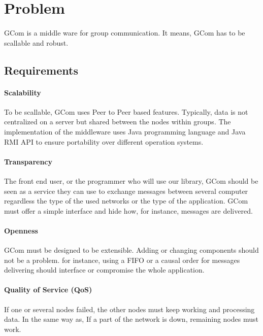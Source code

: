 \section{Problem}

\paragraph{}{
	GCom is a middle ware for group communication. It means,
 GCom has to be scallable and robust.
}

\subsection{Requirements}

\paragraph{Scalability}{
	To be scallable, GCom uses Peer to Peer based features.
 Typically, data is not centralized on a server but shared 
 between the nodes within groups. The implementation of the
 middleware uses Java programming language and Java RMI API to
 ensure portability over different operation systems.
}

\paragraph{Transparency}{
	The front end user, or the programmer who will use our
 library, GCom should be seen as a service they can use to
 exchange messages between several computer regardless the
 type of the used networks or the type of the application.
 GCom must offer a simple interface and hide how, for
 instance, messages are delivered.
}

\paragraph{Openness}{
	GCom must be designed to be extensible. Adding or changing 
 components should not be a problem. for instance, using a FIFO
 or a causal order for messages delivering should interface or
 compromise the whole application.
}

\paragraph{Quality of Service (QoS)}{
	If one or several nodes failed, the other nodes must keep
 working and processing data. In the same way as, If a part of
 the network is down, remaining nodes must work.
}

